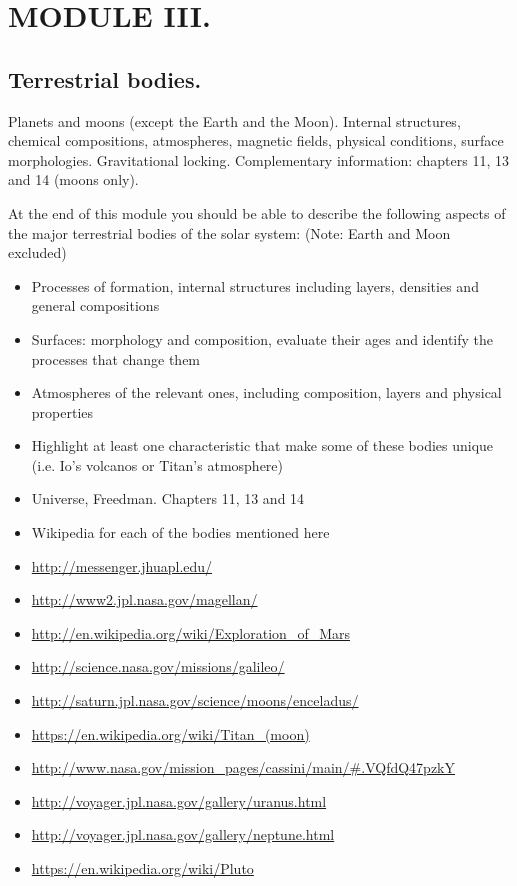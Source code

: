 \section{MODULE III.}
\subsection{Terrestrial bodies.}
Planets and moons (except the Earth and the Moon). Internal structures, chemical compositions, atmospheres, magnetic fields, physical conditions, surface morphologies. Gravitational locking.
Complementary information: chapters 11, 13 and 14 (moons only).

At the end of this module you should be able to describe the following aspects of the major terrestrial bodies of the solar system: (Note: Earth and Moon excluded)

\begin{itemize}
\item Processes of formation, internal structures including layers, densities and general compositions
\item Surfaces: morphology and composition, evaluate their ages and identify the processes that change them
\item Atmospheres of the relevant ones, including composition, layers and physical properties
\item Highlight at least one characteristic that make some of
these bodies unique (i.e. Io’s volcanos or Titan’s atmosphere)
\end{itemize}

\begin{itemize}
\item Universe, Freedman. Chapters 11, 13 and 14
\item Wikipedia for each of the bodies mentioned here
\item \url{http://messenger.jhuapl.edu/}
\item \url{http://www2.jpl.nasa.gov/magellan/}
\item \url{http://en.wikipedia.org/wiki/Exploration_of_Mars}
\item \url{http://science.nasa.gov/missions/galileo/}
\item \url{http://saturn.jpl.nasa.gov/science/moons/enceladus/}
\item \url{https://en.wikipedia.org/wiki/Titan_(moon)}
\item \url{http://www.nasa.gov/mission_pages/cassini/main/#.VQfdQ47pzkY}
\item \url{http://voyager.jpl.nasa.gov/gallery/uranus.html}
\item \url{http://voyager.jpl.nasa.gov/gallery/neptune.html}
\item \url{https://en.wikipedia.org/wiki/Pluto}
\end{itemize}